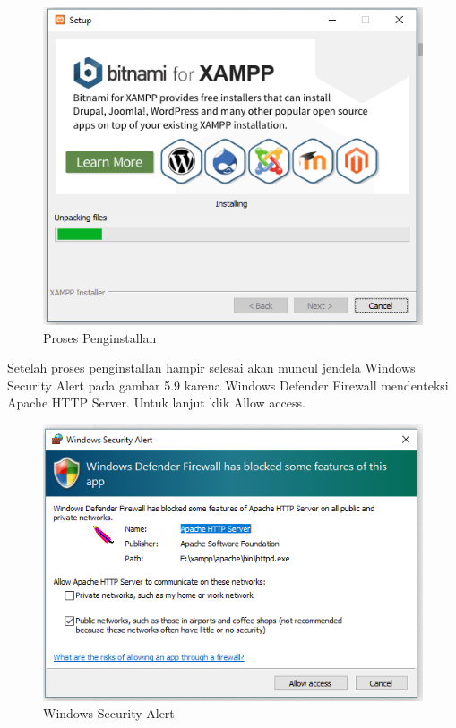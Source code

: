 \begin{figure}[h]
\centering
\includegraphics[scale=0.5]{figures/setup}
\caption{Proses Penginstallan}
\end{figure}

Setelah proses penginstallan hampir selesai akan muncul jendela Windows Security Alert pada gambar 5.9 karena Windows Defender Firewall mendenteksi Apache HTTP Server. Untuk lanjut klik Allow access.

\begin{figure}[h]
\centering
\includegraphics[scale=0.5]{figures/windowssecurityalert}
\caption{Windows Security Alert}
\end{figure}


